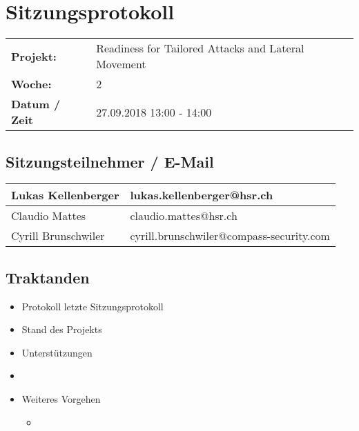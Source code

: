 \newcommand{\TITLE}{Sitzungsprotokoll}
\newcommand{\REVIEW}{<Grund der Sitzung>}
\newcommand{\VERSION}{0.0}





\section*{Sitzungsprotokoll}

\begin{tabular}{p{4cm} p{12cm}}
    \textbf{Projekt:} & Readiness for Tailored Attacks and Lateral Movement  \\
    \textbf{Woche:} & 2 \\
    \textbf{Datum / Zeit} & 27.09.2018 13:00 - 14:00 \\
\end{tabular}

\subsection*{Sitzungsteilnehmer / E-Mail}
\begin{table}[H]
    \centering
    \begin{tabular}{p{4cm} p{12cm}} \hline
        Lukas Kellenberger & lukas.kellenberger@hsr.ch \\ \hline
        Claudio Mattes & claudio.mattes@hsr.ch \\ \hline
        Cyrill Brunschwiler & cyrill.brunschwiler@compass-security.com \\ \hline
    \end{tabular}
\end{table}

\vspace{1cm}

\subsection*{Traktanden}
\begin{itemize}
    \item Protokoll letzte Sitzungsprotokoll
    \item Stand des Projekts
    \item Unterstützungen
    \item <Aufzählung von aktuellen Traktanden oder wichtigen Punkten>
    \item Weiteres Vorgehen
    \begin{itemize}
        \item <Aufzählung von weiterem Vorgehen>
    \end{itemize}
\end{itemize}

